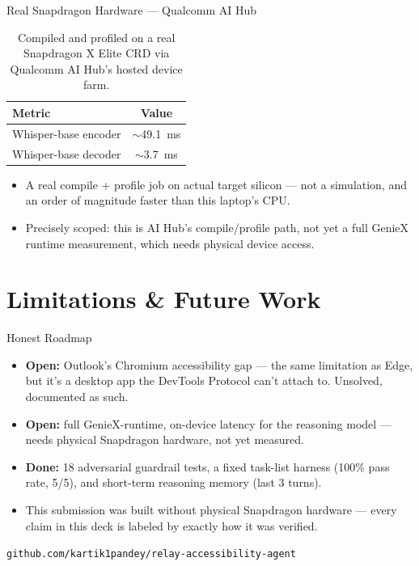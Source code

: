 \documentclass[12pt]{beamer}
\begin{document}
\begin{frame}{Real Snapdragon Hardware --- Qualcomm AI Hub}

\begin{table}
\centering
\begin{tabular}{lc}
\toprule
\textbf{Metric} & \textbf{Value} \\
\midrule
Whisper-base encoder & $\sim$49.1~ms \\
Whisper-base decoder & $\sim$3.7~ms \\
\bottomrule
\end{tabular}
\caption{Compiled and profiled on a real Snapdragon X Elite CRD via Qualcomm AI Hub's hosted device farm.}
\end{table}

\begin{itemize}
  \item A real compile + profile job on actual target silicon --- not a
    simulation, and an order of magnitude faster than this laptop's CPU.
  \item Precisely scoped: this is AI Hub's compile/profile path, not yet
    a full GenieX runtime measurement, which needs physical device
    access.
\end{itemize}

\end{frame}

\section{Limitations \& Future Work}

\begin{frame}{Honest Roadmap}

\begin{itemize}
  \item \textbf{Open:} Outlook's Chromium accessibility gap --- the same
    limitation as Edge, but it's a desktop app the DevTools Protocol
    can't attach to. Unsolved, documented as such.
  \item \textbf{Open:} full GenieX-runtime, on-device latency for the
    reasoning model --- needs physical Snapdragon hardware, not yet
    measured.
  \item \textbf{Done:} 18 adversarial guardrail tests, a fixed task-list
    harness (100\% pass rate, 5/5), and short-term reasoning memory
    (last 3 turns).
  \item This submission was built without physical Snapdragon hardware
    --- every claim in this deck is labeled by exactly how it was
    verified.
\end{itemize}

\vskip 0.5cm
\centering
\small \texttt{github.com/kartik1pandey/relay-accessibility-agent}

\end{frame}
\end{document}
